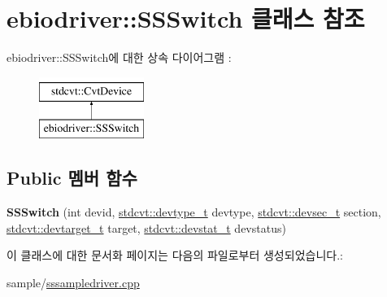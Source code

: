 \hypertarget{classebiodriver_1_1SSSwitch}{}\section{ebiodriver\+:\+:S\+S\+Switch 클래스 참조}
\label{classebiodriver_1_1SSSwitch}
ebiodriver\+:\+:S\+S\+Switch에 대한 상속 다이어그램 \+: \begin{figure}[H]
\begin{center}
\leavevmode
\includegraphics[height=2.000000cm]{classebiodriver_1_1SSSwitch}
\end{center}
\end{figure}
\subsection*{Public 멤버 함수}
\begin{DoxyCompactItemize}
\item 
{\bfseries S\+S\+Switch} (int devid, \hyperlink{cvtcode_8h_ae8e34073e35cef0bb47c7fa535fc638b}{stdcvt\+::devtype\+\_\+t} devtype, \hyperlink{cvtcode_8h_a268eebb73363e24b9e65fd51973bd9c0}{stdcvt\+::devsec\+\_\+t} section, \hyperlink{cvtcode_8h_a2b37fd5cc4d40c0b8c4b987c271e5ceb}{stdcvt\+::devtarget\+\_\+t} target, \hyperlink{cvtcode_8h_ad21cd565f839adc5b19a0993e7da7278}{stdcvt\+::devstat\+\_\+t} devstatus)\hypertarget{classebiodriver_1_1SSSwitch_a9c034c81460c009e7d97138b43ee1e2e}{}\label{classebiodriver_1_1SSSwitch_a9c034c81460c009e7d97138b43ee1e2e}

\end{DoxyCompactItemize}


이 클래스에 대한 문서화 페이지는 다음의 파일로부터 생성되었습니다.\+:\begin{DoxyCompactItemize}
\item 
sample/\hyperlink{sssampledriver_8cpp}{sssampledriver.\+cpp}\end{DoxyCompactItemize}
